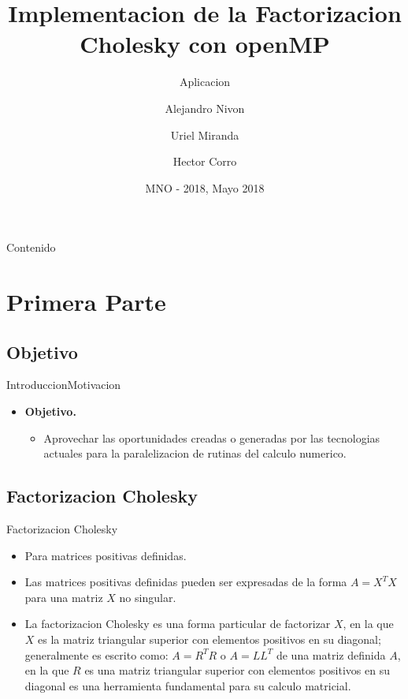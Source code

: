 \documentclass{beamer}
\title{Implementacion de la Factorizacion Cholesky con openMP}
\subtitle{Aplicacion}
\author{Alejandro Nivon\inst{1} \and Uriel Miranda\inst{1} \and Hector Corro\inst{1}}
\institute[Universities of Somewhere and Elsewhere] %
{
  \inst{1}%
  Maestria en Ciencia de Datos\\
  ITAM
}
\date{MNO - 2018, Mayo 2018}
\begin{document}
\begin{frame}
  \titlepage 
\end{frame}

\begin{frame}{Contenido}
  \tableofcontents
\end{frame}

\section{Primera Parte}

\subsection{Objetivo}

\begin{frame}{Introduccion}{Motivacion}
  \begin{itemize}
  \item {
    \textbf{Objetivo.}
  }
  \begin{itemize}
  \item {
    Aprovechar las oportunidades creadas o generadas por las tecnologias actuales para la paralelizacion de rutinas del calculo numerico.
  	}
  \end{itemize}  	
  \end{itemize}
\end{frame}

\subsection{Factorizacion Cholesky}

\begin{frame}{Factorizacion Cholesky}
  \begin{itemize}
  \item {
    Para matrices positivas definidas. 
  }
  \item {   
    Las matrices positivas definidas pueden ser expresadas de la forma $A = X^TX$ para una matriz $X$ no singular.
  }
  \item{
  	La factorizacion Cholesky es una forma particular de factorizar $X$, en la que $X$ es la matriz triangular superior con elementos positivos en su diagonal; generalmente es escrito como: \(A = R^TR\) o $A = LL^T$ de una matriz definida \(A\), en la que \(R\) es una matriz triangular superior con elementos positivos en su diagonal es una herramienta fundamental para su calculo matricial.
  } 
    \end{itemize}
\end{frame}
\end{document}
